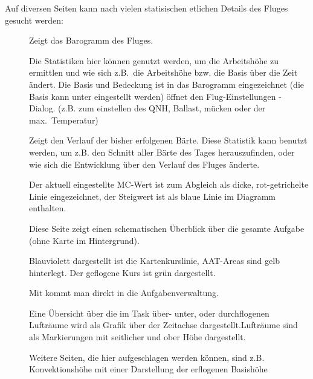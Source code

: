 Auf diversen Seiten kann nach vielen statisischen etlichen Details  des Fluges gesucht werden:


\begin{description}
\item[]  Zeigt das Barogramm des Fluges.

Die Statistiken hier können genutzt werden, um die Arbeitshöhe zu ermittlen und wie sich z.B.\  die Arbeitshöhe bzw. die Basis über die Zeit ändert. Die Basis und Bedeckung ist in das Barogramm eingezeichnet (die Basis kann unter   eingestellt werden)
  öffnet den Flug-Einstellungen - Dialog.
  (z.B. zum einstellen des QNH, Ballast, mücken oder der max.\ Temperatur)
\vspace{7em}

\item[]
  Zeigt den Verlauf der bisher erfolgenen Bärte.
  Diese Statistik kann benutzt werden, um z.B. den Schnitt aller Bärte des Tages herauszufinden, oder wie sich die Entwicklung über den Verlauf des Fluges änderte.

  Der aktuell eingestellte MC-Wert  ist zum Abgleich als dicke, rot-getrichelte Linie eingezeichnet, der Steigwert ist als blaue Linie im Diagramm enthalten.

\vspace{5em}
\newpage
\item[]
Diese Seite zeigt einen schematischen Überblick über die gesamte Aufgabe (ohne Karte im Hintergrund).


Blauviolett dargestellt ist die Kartenkurslinie, AAT-Areas sind gelb hinterlegt. 
Der geflogene Kurs ist grün dargestellt.

Mit  kommt man direkt in die Aufgabenverwaltung.


\vspace{7em}
\item[]
Eine Übersicht über die im Task über- unter, oder durchflogenen Lufträume wird als Grafik über der Zeitachse dargestellt.Lufträume sind als Markierungen mit seitlicher und ober Höhe  dargestellt.

Weitere Seiten, die hier aufgeschlagen werden können,  sind z.B. Konvektionshöhe mit einer Darstellung der erflogenen Basishöhe
\vspace{7em}

\end{description}

